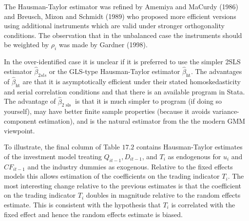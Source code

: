 \documentclass[10pt]{article}
\begin{document}
The Hausman-Taylor estimator was refined by Amemiya and MaCurdy (1986) and Breusch, Mizon and Schmidt (1989) who proposed more efficient versions using additional instruments which are valid under stronger orthogonality conditions. The observation that in the unbalanced case the instruments should be weighted by $\rho_{i}$ was made by Gardner (1998).

In the over-identified case it is unclear if it is preferred to use the simpler 2SLS estimator $\widehat{\beta}_{2 s l s}$ or the GLS-type Hausman-Taylor estimator $\widehat{\beta}_{\mathrm{ht}}$. The advantages of $\widehat{\beta}_{\mathrm{ht}}$ are that it is asymptotically efficient under their stated homoskedasticity and serial correlation conditions and that there is an available program in Stata. The advantage of $\widehat{\beta}_{2 \text { sls }}$ is that it is much simpler to program (if doing so yourself), may have better finite sample properties (because it avoids variance-component estimation), and is the natural estimator from the the modern GMM viewpoint.

To illustrate, the final column of Table $17.2$ contains Hausman-Taylor estimates of the investment model treating $Q_{i t-1}, D_{i t-1}$, and $T_{i}$ as endogenous for $u_{i}$ and $C F_{i t-1}$ and the industry dummies as exogenous. Relative to the fixed effects models this allows estimation of the coefficients on the trading indicator $T_{i}$. The most interesting change relative to the previous estimates is that the coefficient on the trading indicator $T_{i}$ doubles in magnitude relative to the random effects estimate. This is consistent with the hypothesis that $T_{i}$ is correlated with the fixed effect and hence the random effects estimate is biased.
\end{document}
